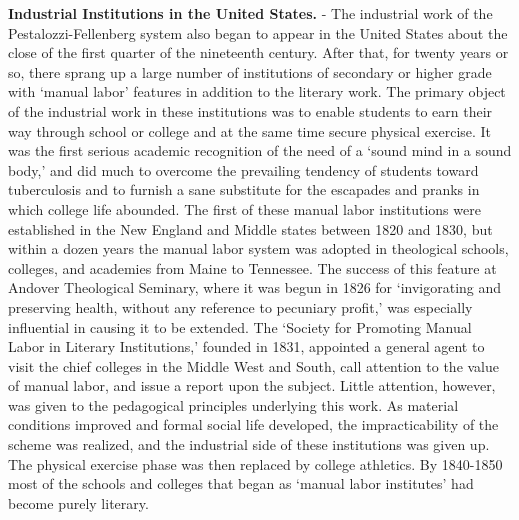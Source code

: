 \documentclass[
]{book}
\begin{document}
\textbf{Industrial Institutions in the United States.} - The industrial work of the Pestalozzi-Fellenberg system also began to appear in the United States about the close of the first quarter of the nineteenth century. After that, for twenty years or so, there sprang up a large number of institutions of secondary or higher grade with `manual labor' features in addition to the literary work. The primary object of the industrial work in these institutions was to enable students to earn their way through school or college and at the same time secure physical exercise. It was the first serious academic recognition of the need of a `sound mind in a sound body,' and did much to overcome the prevailing tendency of students toward tuberculosis and to furnish a sane substitute for the escapades and pranks in which college life abounded. The first of these manual labor institutions were established in the New England and Middle states between 1820 and 1830, but within a dozen years the manual labor system was adopted in theological schools, colleges, and academies from Maine to Tennessee. The success of this feature at Andover Theological Seminary, where it was begun in 1826 for `invigorating and preserving health, without any reference to pecuniary profit,' was especially influential in causing it to be extended. The `Society for Promoting Manual Labor in Literary Institutions,' founded in 1831, appointed a general agent to visit the chief colleges in the Middle West and South, call attention to the value of manual labor, and issue a report upon the subject. Little attention, however, was given to the pedagogical principles underlying this work. As material conditions improved and formal social life developed, the impracticability of the scheme was realized, and the industrial side of these institutions was given up. The physical exercise phase was then replaced by college athletics. By 1840-1850 most of the schools and colleges that began as `manual labor institutes' had become purely literary.
\end{document}
